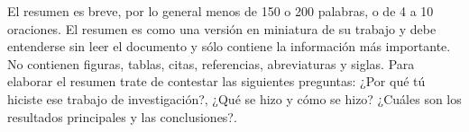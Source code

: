 El resumen es breve, por lo general menos de 150 o 200 palabras, o de 4 a 10 oraciones. El resumen es como una versión en miniatura de su trabajo y debe entenderse sin leer el documento y sólo contiene la información más importante. No contienen figuras, tablas, citas,  referencias, abreviaturas y siglas. Para elaborar el resumen trate de contestar las siguientes preguntas: ¿Por qué tú hiciste ese trabajo de investigación?, ¿Qué se hizo y cómo se hizo? ¿Cuáles son los resultados principales y las conclusiones?.
